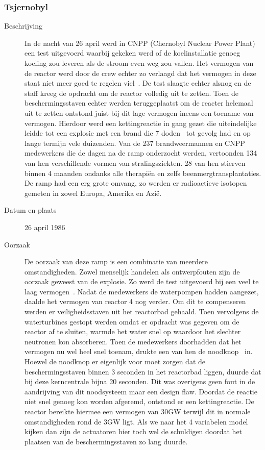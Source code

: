 \documentclass{article}
\begin{document}
\subsubsection{Tsjernobyl}
\begin{description}
\item[Beschrijving]
In de nacht van 26 april werd in CNPP (Chernobyl Nuclear Power Plant) een test uitgevoerd waarbij gekeken werd of de koelinstallatie genoeg koeling zou leveren als de stroom even weg zou vallen. Het vermogen van de reactor werd door de crew echter zo verlaagd dat het vermogen in deze staat niet meer goed te regelen viel~\cite{chernobylaccident}. De test slaagte echter alsnog en de staff kreeg de opdracht om de reactor volledig uit te zetten. Toen de beschermingsstaven echter werden teruggeplaatst om de reacter helemaal uit te zetten ontstond juist bij dit lage vermogen ineens een toename van vermogen. Hierdoor werd een kettingreactie in gang gezet die uiteindelijke leidde tot een explosie met een brand die 7 doden~\cite{chernobylconsequences} tot gevolg had en op lange termijn vele duizenden. Van de 237 brandweermannen en CNPP medewerkers die de dagen na de ramp onderzocht werden, vertoonden 134 van hen verschillende vormen van stralingsziekten. 28 van hen stierven binnen 4 maanden ondanks alle therapiën en zelfs beenmergtransplantaties. De ramp had een erg grote omvang, zo werden er radioactieve isotopen gemeten in zowel Europa, Amerika en Azië.

\item[Datum en plaats] 
26 april 1986

\item[Oorzaak]
De oorzaak van deze ramp is een combinatie van meerdere omstandigheden. Zowel menselijk handelen als ontwerpfouten zijn de oorzaak geweest van de explosie. Zo werd de test uitgevoerd bij een veel te laag vermogen~\cite{chernobylaccident}. Nadat de medewerkers de waterpompen hadden aangezet, daalde het vermogen van reactor 4 nog verder. Om dit te compenseren werden er veiligheidsstaven uit het reactorbad gehaald. Toen vervolgens de waterturbines gestopt werden omdat er opdracht was gegeven om de reactor af te sluiten, warmde het water snel op waardoor het slechter neutronen kon absorberen. Toen de medewerkers doorhadden dat het vermogen nu wel heel snel toenam, drukte een van hen de noodknop~\cite{chernobylconsequences} in. Hoewel de noodknop er eigenlijk voor moet zorgen dat de beschermingsstaven binnen 3 seconden in het reactorbad liggen, duurde dat bij deze kerncentrale bijna 20 seconden. Dit was overigens geen fout in de aandrijving van dit noodsysteem maar een design flaw. Doordat de reactie niet snel genoeg kon worden afgeremd, ontstond er een kettingreactie. De reactor bereikte hiermee een vermogen van 30GW terwijl dit in normale omstandigheden rond de 3GW ligt. Als we naar het 4 variabelen model kijken dan zijn de actuatoren hier toch wel de schuldigen doordat het plaatsen van de beschermingsstaven zo lang duurde.

\end{description}
\end{document}
